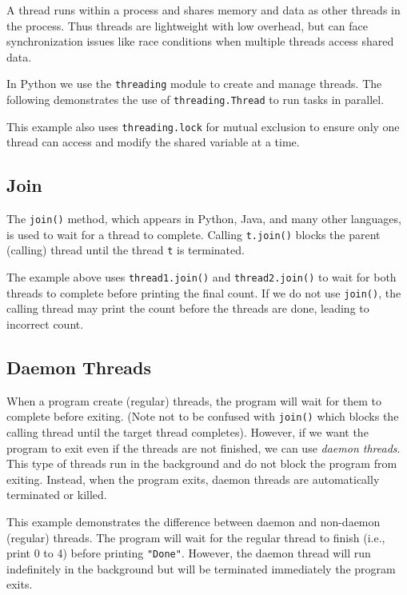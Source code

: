 \documentclass[oneside,11pt,dvipsnames]{book}
\newcommand{\code}[1]{\texttt{#1}}
\begin{document}
A thread runs within a process and shares memory and data as other threads in the process. Thus threads are lightweight with low overhead, but can face synchronization issues like race conditions when multiple threads access shared data.

In Python we use the \code{threading} module to create and manage threads. The following demonstrates the use of \code{threading.Thread} to run tasks in parallel. 

This example also uses \code{threading.lock} for mutual exclusion to ensure only one thread can access and modify the shared variable at a time.

%


\subsection{Join}
The \code{join()} method, which appears in Python, Java, and many other languages, is used to wait for a thread to complete. Calling \code{t.join()} blocks the parent (calling) thread until the thread \code{t} is terminated. 

The example above uses \code{thread1.join()} and \code{thread2.join()} to wait for both threads to complete before printing the final count.
If we do not use \code{join()}, the calling thread may print the count before the threads are done, leading to incorrect count.

\subsection{Daemon Threads}

When a program create (regular) threads, the program will wait for them to complete before exiting. (Note not to be confused with \code{join()} which blocks the calling thread until the target thread completes). However, if we want the program to exit even if the threads are not finished, we can use \emph{daemon threads}. This type of threads run in the background and do not block the program from exiting. Instead, when the program exits, daemon threads are automatically terminated or killed.



This example demonstrates the difference between daemon and non-daemon (regular) threads. The program will wait for the regular thread to finish (i.e., print 0 to 4) before printing \code{"Done"}. However, the daemon thread will run indefinitely in the background but will be terminated immediately the program exits.
\end{document}

